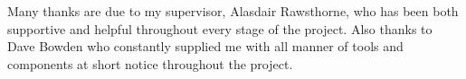 Many thanks are due to my supervisor, Alasdair Rawsthorne, who has been both
supportive and helpful throughout every stage of the project. Also thanks to
Dave Bowden who constantly supplied me with all manner of tools and components
at short notice throughout the project.
